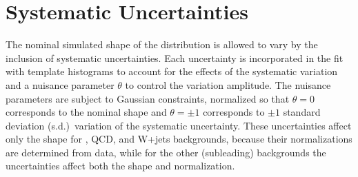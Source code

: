 \chapter{Systematic Uncertainties}
\label{chap:systematics}

The nominal simulated shape of the \Nb distribution is allowed to vary by the inclusion of systematic uncertainties.
Each uncertainty is incorporated in the fit with template \Nb histograms to account for the effects of the systematic variation and a nuisance parameter $\theta$ to control the variation amplitude.
The nuisance parameters are subject to Gaussian constraints, normalized so that $\theta=0$ corresponds to the nominal \Nb shape and $\theta=\pm1$ corresponds to $\pm1$ standard deviation (s.d.)\ variation of the systematic uncertainty.
These uncertainties affect only the \Nb shape for \ttbar, QCD, and W+jets backgrounds, because their normalizations are determined from data, while for the other (subleading) backgrounds the uncertainties affect both the \Nb shape and normalization.

